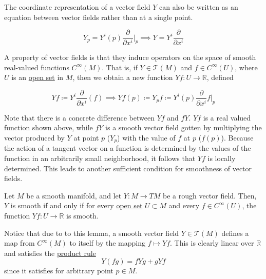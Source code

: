 \documentclass{article}
\begin{document}
    The coordinate representation of a vector field $Y$ can also be written as an equation between vector fields rather than at a single point.

      \begin{equation}
        Y_p = Y^i (p) \frac{\partial}{\partial x^i} \bigg|_p \implies Y = Y^i \frac{\partial}{\partial x^i}
      \end{equation}

    A property of vector fields is that they induce operators on the space of smooth real-valued functions $C^\infty (M)$. That is, if $Y \in \mathcal{T}(M)$ and $f \in C^\infty (U)$, where $U$ is an \hyperref[pst-def:open-set]{open set} in $M$, then we obtain a new function $Y f: U \to \mathbb{R}$, defined 

      \begin{equation}
        Y f \coloneqq Y^i \frac{\partial}{\partial x^i} (f) \implies Y f(p) \coloneqq Y_p f \coloneqq Y^i (p) \frac{\partial}{\partial x^i} f \bigg|_p
      \end{equation}

    Note that there is a concrete difference between $Y f$ and $f Y$. $Y f$ is a real valued function shown above, while $f Y$ is a smooth vector field gotten by multiplying the vector produced by $Y$ at point $p$ ($Y_p$) with the value of $f$ at $p$ ($f(p)$). Because the action of a tangent vector on a function is determined by the values of the function in an arbitrarily small neighborhood, it follows that $Y f$ is locally determined. This leads to another sufficient condition for smoothness of vector fields. 

    \begin{lemma}
      \label{thm:smoothness-criterion-for-a-rough-vector-field}
      Let $M$ be a smooth manifold, and let $Y: M \to TM$ be a rough vector field. Then, $Y$ is smooth if and only if for every \hyperref[pst-def:open-set]{open set} $U \subset M$ and every $f \in C^\infty (U)$, the function $Y f: U \to \mathbb{R}$ is smooth. 
    \end{lemma}

    Notice that due to to this lemma, a smooth vector field $Y \in \mathcal{T}(M)$ defines a map from $C^\infty(M)$ to itself by the mapping $f \mapsto Y f$. This is clearly linear over $\mathbb{R}$ and satisfies the \hyperref[mv-thm:product-rule-2]{product rule} 
      \begin{equation}
        Y(f g) = f Y g + g Y f
      \end{equation}
    since it satisfies for arbitrary point $p \in M$. 
\end{document}
